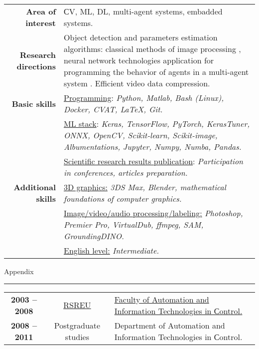 \documentclass[11pt]{article}
\begin{document}
	\begin{longtable} {r | p{}}
		\textbf{Area of interest}\vspace{1em} & СV, ML, DL, multi-agent systems, embadded systems.\\
		
		\textbf{Research directions}\vspace{1em} & Object detection and parameters estimation algorithms: classical methods of image processing \cite{wrt}, neural network technologies application for programming the behavior of agents in a multi-agent system \cite{mas}. Efficient video data compression.\\
		
		\textbf{Basic skills} & \underline{Programming}: \it{Python, Matlab, Bash (Linux), Docker, CVAT, \LaTeX, Git.}\vspace{0.5em}\\ 
		& \underline{ML stack}: \it{Keras, TensorFlow, PyTorch, KerasTuner, ONNX, OpenCV, Scikit-learn, Scikit-image, Albumentations, Jupyter, Numpy, Numba, Pandas.}\vspace{0.5em}\\
		\vspace{1em} & \underline{Scientific research results publication}: \it{Participation in conferences, articles preparation.}\\
		
		\textbf{Additional skills} & \underline{3D graphics:} \it{3DS Max, Blender, mathematical foundations of computer graphics.}\\
		& \underline{Image/video/audio processing/labeling:} \it{Photoshop, Premier Pro, VirtualDub, ffmpeg, SAM, GroundingDINO.}\\
		\vspace{1em} & \underline{English level:} \it{Intermediate.}\\
	\end{longtable}		
	
	\newpage
	Appendix
	\hrule
	\vspace{1em}
	
	
	\begin{tabular} {c | c | p{}}
		\textbf{2003 -- 2008} & \href{http://www.rsreu.ru/en/}{RSREU} & \href{http://www.rsreu.ru/en/about-university/faculties-and-departments/faculty-of-automation-and-information-technologies-in-sontrol}{Faculty of Automation and Information Technologies in Сontrol.} \vspace{0.5em}\\
		\textbf{2008 -- 2011} & Postgraduate studies & Department of Automation and Information Technologies in Сontrol.\\
	\end{tabular}
	
\end{document}
